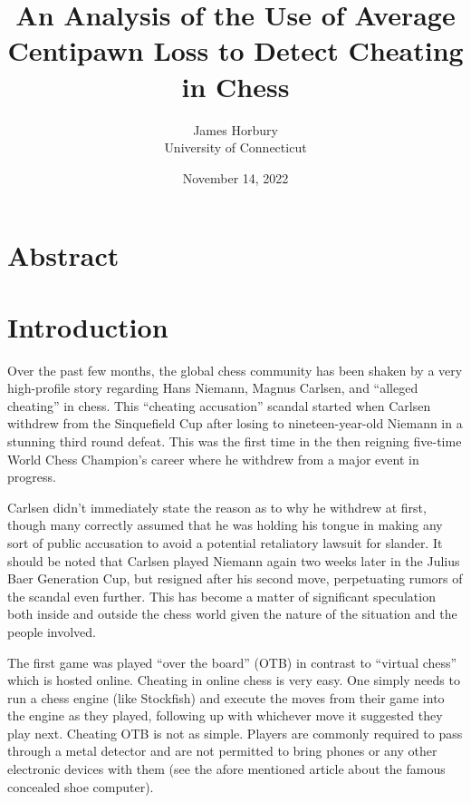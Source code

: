 \documentclass[12pt]{article}
\title{An Analysis of the Use of Average Centipawn Loss to Detect Cheating in Chess}
\author{James Horbury\\
    University of Connecticut
}
\date{November 14, 2022}
\begin{document}
\maketitle

\section*{Abstract}
\label{sec:abs}


\section*{Introduction}
\label{sec:intro}

Over the past few months, the global chess community has been shaken by a very high-profile story regarding Hans Niemann, Magnus Carlsen, and “alleged cheating” in chess. This “cheating accusation” scandal started when Carlsen withdrew from the Sinquefield Cup after losing to nineteen-year-old Niemann in a stunning third round defeat. This was the first time in the then reigning five-time World Chess Champion's career where he withdrew from a major event in progress.

Carlsen didn't immediately state the reason as to why he withdrew at first, though many correctly assumed that he was holding his tongue in making any sort of public accusation to avoid a potential retaliatory lawsuit for slander. It should be noted that Carlsen played Niemann again two weeks later in the Julius Baer Generation Cup, but resigned after his second move, perpetuating rumors of the scandal even further. This has become a matter of significant speculation both inside and outside the chess world given the nature of the situation and the people involved. 

The first game was played “over the board” (OTB) in contrast to “virtual chess” which is hosted online. Cheating in online chess is very easy. One simply needs to run a chess engine (like Stockfish) and execute the moves from their game into the engine as they played, following up with whichever move it suggested they play next. Cheating OTB is not as simple. Players are commonly required to pass through a metal detector and are not permitted to bring phones or any other electronic devices with them (see the afore mentioned article about the famous concealed shoe computer).
\end{document}

